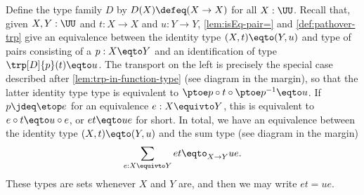 Define the type family $D$ by $D(X) \defeq (X\to X)$ for all $X:\UU$.
Recall that, given $X,Y:\UU$ and $t:X\to X$ and $u:Y\to Y$,
\cref{lem:isEq-pair=} and \cref{def:pathover-trp} give
an equivalence between the identity type $(X,t)\eqto (Y,u)$ and
type of pairs consisting of a $p:X\eqto Y$ and an identification
of type $\trp[D]{p}(t)\eqto u$. The transport on the left is precisely
the special case described after \cref{lem:trp-in-function-type}
(see diagram in the margin),
so that the latter identity type
type is equivalent to $\ptoe p\circ t\circ \ptoe p^{-1} \eqto u$.
If $p\jdeq\etop e$ for an equivalence $e:X\equivto Y$,
this is equivalent to $e\circ t \eqto u\circ e$, or $e t \eqto u e$ for short.
In total, we have an equivalence between the identity type
$(X,t)\eqto(Y,u)$ and the sum type (see diagram in the margin)
\[
  \sum_{e: X\equivto Y} et \eqto_{X\to Y} ue.
\]
These types are sets whenever $X$ and $Y$ are, and then we
may write $et = ue$.
